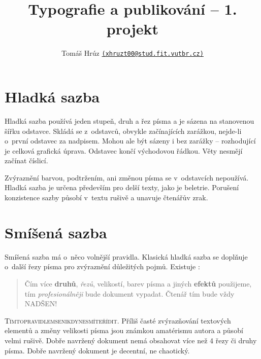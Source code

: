 \documentclass[a4paper,10pt,twocolumn]{article}
\begin{document}
\title{Typografie a publikování – 1. projekt}
\author{Tomáš Hrúz  \href{mailto:xhruzt00@stud.fit.vutbr.cz}{\texttt{(xhruzt00@stud.fit.vutbr.cz)}}}
\date{}
\maketitle

\section{Hladká sazba}
Hladká sazba používá jeden stupeň, druh a řez písma a je sázena na stanovenou šířku odstavce. Skládá se z~odstavců, obvykle začínajících zarážkou, nejde-li o~první odstavec za nadpisem. Mohou ale být sázeny i bez zarážky -- rozhodující je celková grafická úprava. Odstavec končí východovou řádkou. Věty nesmějí začínat číslicí.

Zvýraznění barvou, podtržením, ani změnou písma se v~odstavcích nepoužívá. Hladká sazba je určena především pro delší texty, jako je beletrie. Porušení konzistence sazby působí v~textu rušivě a unavuje čtenářův zrak.

\section{Smíšená sazba}\label{section2}
Smíšená sazba má o~něco volnější pravidla. Klasická hladká sazba se doplňuje o~další řezy písma pro zvýraznění důležitých pojmů. Existuje :
\smallskip

\begin{quotation}\hspace{-5.3mm}Čím více \textbf{druhů}, \emph{řezů},{ \small velikostí}, barev písma a \textsf{jiných \tiny\textbf{efektů}} použijeme, tím \textit{profesionálněji} bude dokument vypadat. Čtenář tím bude {\LARGE vždy} {\huge NADŠEN\Huge !}
\end{quotation}
\smallskip

\textsc{Tímto\hspace{2.2mm}pravidlem\hspace{2.2mm}se\hspace{2.2mm}nikdy\hspace{2.2mm}nesmíte\hspace{2.2mm}řídit.} Příliš časté zvýrazňování textových elementů a změny velikosti písma jsou známkou amatérismu autora a působí velmi rušivě. Dobře navržený dokument nemá obsahovat více než
4 řezy či druhy písma. Dobře navržený dokument je decentní, ne chaotický.
\end{document}
